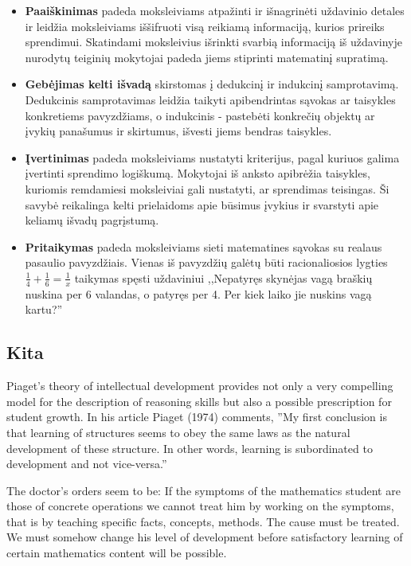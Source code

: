 \documentclass{article}
\begin{document}
\begin{itemize}
\item \textbf{Paaiškinimas} padeda moksleiviams atpažinti ir išnagrinėti uždavinio detales ir leidžia moksleiviams iššifruoti visą reikiamą informaciją, kurios prireiks sprendimui. Skatindami moksleivius išrinkti svarbią informaciją iš uždavinyje nurodytų teiginių mokytojai padeda jiems stiprinti matematinį supratimą.
\item \textbf{Gebėjimas kelti išvadą} skirstomas į dedukcinį ir indukcinį samprotavimą. Dedukcinis samprotavimas leidžia taikyti apibendrintas sąvokas ar taisykles konkretiems pavyzdžiams, o indukcinis - pastebėti konkrečių objektų ar įvykių panašumus ir skirtumus, išvesti jiems bendras taisykles.
\item \textbf{Įvertinimas} padeda moksleiviams nustatyti kriterijus, pagal kuriuos galima įvertinti sprendimo logiškumą. Mokytojai iš anksto apibrėžia taisykles, kuriomis remdamiesi moksleiviai gali nustatyti, ar sprendimas teisingas. Ši savybė reikalinga kelti prielaidoms apie būsimus įvykius ir svarstyti apie keliamų išvadų pagrįstumą.
\item \textbf{Pritaikymas} padeda moksleiviams sieti matematines sąvokas su realaus pasaulio pavyzdžiais. Vienas iš pavyzdžių galėtų būti racionaliosios lygties $\frac{1}{4}+\frac{1}{6}=\frac{1}{x}$ taikymas spęsti uždaviniui ,,Nepatyręs skynėjas vagą braškių nuskina per 6 valandas, o patyręs per 4. Per kiek laiko jie nuskins vagą kartu?''
\end{itemize}

\subsection{Kita}

Piaget's theory of intellectual development provides not only a very compelling model for
the description of reasoning skills but also a possible prescription for student growth. In his
article Piaget (1974) comments, ''My first conclusion is that learning of structures seems to obey
the same laws as the natural development of these structure. In other words, learning is
subordinated to development and not vice-versa.''

 The doctor's orders seem to be: If the symptoms of the mathematics student are those of
concrete operations we cannot treat him by working on the symptoms, that is by teaching
specific facts, concepts, methods. The cause must be treated. We must somehow change his level
of development before satisfactory learning of certain mathematics content will be possible.
\end{document}
